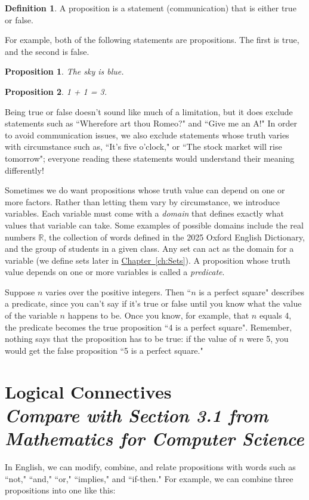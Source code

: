 \documentclass[11pt,oneside]{book}
\newtheorem*{prop}{Proposition}
\theoremstyle{definition}
\newtheorem{defn}[thm]{Definition}
\begin{document}
\begin{defn}
    A proposition is a statement (communication) that is either true or
    false.
\end{defn}
For example, both of the following statements are propositions.
The first is true, and the second is false.

\begin{prop} The sky is blue. \end{prop}
\begin{prop} 1 + 1 = 3. \end{prop}

Being true or false doesn't sound like much of a limitation, but it does exclude statements such as ``Wherefore art thou Romeo?" and ``Give me an A!"
In order to avoid communication issues, we also exclude statements whose truth varies with circumstance such as, ``It's five o'clock," or ``The stock market will rise tomorrow"; everyone reading these statements would understand their meaning differently!

Sometimes we do want propositions whose truth value can depend on one or more factors.
Rather than letting them vary by circumstance, we introduce variables.
Each variable must come with a \emph{domain} that defines exactly what values that variable can take.
Some examples of possible domains include the real numbers $\mathbb{R}$, the collection of words defined in the 2025 Oxford English Dictionary, and the group of students in a given class.
Any set can act as the domain for a variable (we define sets later in \hyperref[ch:Sets]{Chapter~\ref*{ch:Sets}}).
A proposition whose truth value depends on one or more variables is called a \emph{predicate}.

Suppose $n$ varies over the positive integers.
Then ``$n$ is a perfect square" describes a predicate, since you can't say if it's true or false until you know what the value of the variable $n$ happens to be.
Once you know, for example, that $n$ equals 4, the predicate becomes the true proposition ``4 is a perfect square".
Remember, nothing says that the proposition has to be true: if the value of $n$ were 5, you would get the false proposition ``5 is a perfect square."


\section[Logical Connectives]{Logical Connectives\\[0.5ex]
\normalsize\normalfont\textit{
    Compare with Section 3.1 from \emph{Mathematics for Computer Science}
}}
In English, we can modify, combine, and relate propositions with words such as
``not," ``and," ``or," ``implies," and ``if-then."
For example, we can combine three propositions into one like this:
\end{document}
